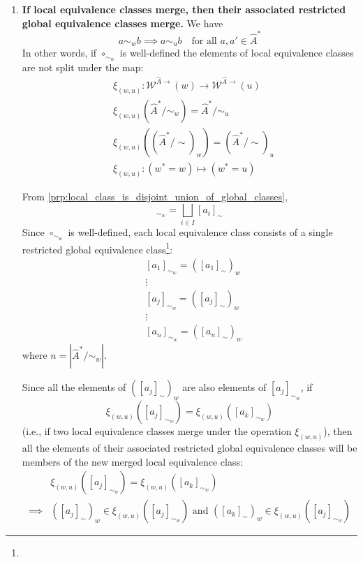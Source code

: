 \begin{proofE}
\begin{enumerate}
    \item \textbf{If local equivalence classes merge, then their associated restricted global equivalence classes merge.}
    We have
    \begin{equation}
        a \sim_{w} b \implies a \sim_{u} b \quad \text{for all $a,a' \in \hat{A}^{*}$}
    \end{equation}
    In other words, if $\circ_{\sim_{w}}$ is well-defined the elements of local equivalence classes are not split under the map:
    \begin{align}
        & \xi_{(w, u)}: \mathscr{W}^{\hat{A}\to}(w) \to \mathscr{W}^{\hat{A}\to}(u) \\
        & \xi_{(w, u)}(\hat{A}^{*}/\sim_{w}) = \hat{A}^{*}/\sim_{u} \\
        & \xi_{(w, u)}((\hat{A}^{*}/\sim)_{w}) = (\hat{A}^{*}/\sim)_{u} \\
        & \xi_{(w, u)}: (w^{*}=w) \mapsto (w^{*}=u)
    \end{align}

    From \cref{prp:local_class_is_disjoint_union_of_global_classes},
    \begin{equation}
        [a]_{\sim_{w}} = \bigsqcup_{i \in I}[a_{i}]_{\sim}
    \end{equation}
    Since $\circ_{\sim_{w}}$ is well-defined, each local equivalence class consists of a single restricted global equivalence class\footnote{
    }:
    \begin{align}
        & [a_{1}]_{\sim_{w}} = ([a_{1}]_{\sim})_{w} \\
        & \vdots \\
        & [a_{j}]_{\sim_{w}} = ([a_{j}]_{\sim})_{w} \\
        & \vdots \\
        & [a_{n}]_{\sim_{w}} = ([a_{n}]_{\sim})_{w}
    \end{align}
    where $n = |\hat{A}^{*}/\sim_{w}|$.

    Since all the elements of $([a_{j}]_{\sim})_{w}$ are also elements of $[a_{j}]_{\sim_{w}}$, if
    \begin{equation}
        \xi_{(w, u)}([a_{j}]_{\sim_{w}}) = \xi_{(w, u)}([a_{k}]_{\sim_{w}})
    \end{equation}
    (i.e., if two local equivalence classes merge under the operation $\xi_{(w, u)}$), then all the elements of their associated restricted global equivalence classes will be members of the new merged local equivalence class:
    \begin{align}
        & \xi_{(w, u)}([a_{j}]_{\sim_{w}}) = \xi_{(w, u)}([a_{k}]_{\sim_{w}}) \\
        \implies & ([a_{j}]_{\sim})_{w} \in \xi_{(w, u)}([a_{j}]_{\sim_{w}}) \text{ and } ([a_{k}]_{\sim})_{w} \in \xi_{(w, u)}([a_{j}]_{\sim_{w}})
    \end{align}
    

\end{enumerate}
\end{proofE}
